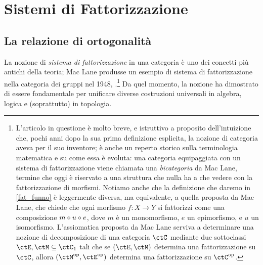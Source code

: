 \chapter{Sistemi di Fattorizzazione}
\label{cap_fattorizzazione}
\section{La relazione di ortogonalità}
La nozione di \emph{sistema di fattorizzazione} in una categoria è uno dei concetti più antichi della teoria; Mac Lane produsse un esempio di sistema di fattorizzazione nella categoria dei gruppi nel 1948, \cite{maclane_grp_duality}.\footnote{L'articolo in questione è molto breve, e istruttivo a proposito dell'intuizione che, pochi anni dopo la sua prima definizione esplicita, la nozione di categoria aveva per il suo inventore; è anche un reperto storico sulla terminologia matematica e su come essa è evoluta: una categoria equipaggiata con un sistema di fattorizzazione viene chiamata una \emph{bicategoria} da Mac Lane, termine che oggi è riservato a una struttura che nulla ha a che vedere con la fattorizzazione di morfismi. Notiamo anche che la definizione che daremo in \ref{fat_funno} è leggermente diversa, ma equivalente, a quella proposta da Mac Lane, che chiede che ogni morfismo \(f : X\to Y\) si fattorizzi come una composizione \(m\circ u\circ e\), dove \(m\) è un monomorfismo, \(e\) un epimorfismo, e \(u\) un isomorfismo. L'assiomatica proposta da Mac Lane serviva a determinare una nozione di decomposizione di una categoria \(\ctC\) mediante due sottoclassi \(\ctE,\ctM\subseteq\ctC_1\) tali che se \((\ctE,\ctM)\) determina una fattorizzazione su \(\ctC\), allora \((\ctM^\op,\ctE^\op)\) determina una fattorizzazione su \(\ctC^\op\).} Da quel momento, la nozione ha dimostrato di essere fondamentale per unificare diverse costruzioni universali in algebra, logica e (soprattutto) in topologia.


